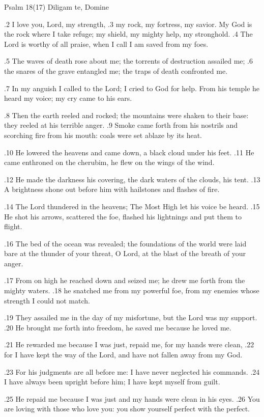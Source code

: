 Psalm 18(17) Diligam te, Domine

.2 I love you, Lord, my strength,
.3 my rock, my fortress, my savior.
My God is the rock where I take refuge;
my shield, my mighty help, my stronghold.
.4 The Lord is worthy of all praise,
when I call I am saved from my foes.

.5 The waves of death rose about me;
the torrents of destruction assailed me;
.6 the snares of the grave entangled me;
the traps of death confronted me.

.7 In my anguish I called to the Lord;
I cried to God for help.
From his temple he heard my voice;
my cry came to his ears.

.8 Then the earth reeled and rocked;
the mountains were shaken to their base:
they reeled at his terrible anger.
.9 Smoke came forth from his nostrils
and scorching fire from his mouth:
coals were set ablaze by its heat.

.10 He lowered the heavens and came down,
a black cloud under his feet.
.11 He came enthroned on the cherubim,
he flew on the wings of the wind.

.12 He made the darkness his covering,
the dark waters of the clouds, his tent.
.13 A brightness shone out before him
with hailstones and flashes of fire.

.14 The Lord thundered in the heavens;
The Most High let his voice be heard.
.15 He shot his arrows, scattered the foe,
flashed his lightnings and put them to flight.

.16 The bed of the ocean was revealed;
the foundations of the world were laid bare
at the thunder of your threat, O Lord,
at the blast of the breath of your anger.

.17 From on high he reached down and seized me;
he drew me forth from the mighty waters.
.18 he snatched me from my powerful foe,
from my enemies whose strength I could not match.

.19 They assailed me in the day of my misfortune,
but the Lord was my support.
.20 He brought me forth into freedom,
he saved me because he loved me.

.21 He rewarded me because I was just,
repaid me, for my hands were clean,
.22 for I have kept the way of the Lord,
and have not fallen away from my God.

.23 For his judgments are all before me:
I have never neglected his commands.
.24 I have always been upright before him;
I have kept myself from guilt.

.25 He repaid me because I was just
and my hands were clean in his eyes.
.26 You are loving with those who love you:
you show yourself perfect with the perfect.

